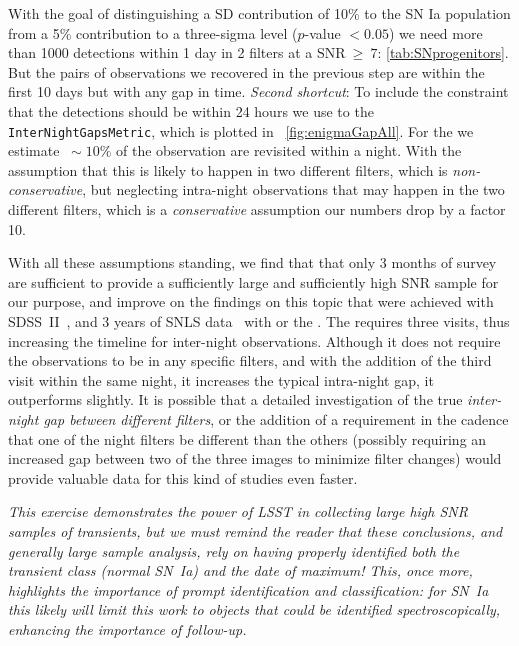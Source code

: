 With the goal of distinguishing a SD contribution of 10\% to the SN Ia
population from a 5\% contribution to a three-sigma level ($p$-value $<0.05$)  we need more
than 1000 detections within 1 day in 2 filters at a
$\mathrm{SNR}~\geq~7$: \autoref{tab:SNprogenitors}. But the pairs
of observations we recovered in the previous step are within the first
10 days but with any gap in time. \emph{Second shortcut}: To include
the constraint that the detections should be within 24 hours we use
to the \texttt{InterNightGapsMetric}, which is plotted in
~\autoref{fig:enigmaGapAll}.  For the  we
estimate $~\sim10\%$ of the observation are revisited within a
night. With the assumption that this is likely to happen in two
different filters, which is \emph{non-conservative}, but neglecting
intra-night observations that may happen in the two different filters,
which is a \emph{conservative} assumption our numbers drop by a factor
10.

With all these assumptions standing, we find that that only 3 months
of survey are sufficient to provide a sufficiently large and
sufficiently high SNR sample for our purpose, and improve on the
findings on this topic that were achieved with
SDSS~II~\citep{Hayden2010}, and 3 years of SNLS data~\citep{Bianco11}
with  or the
. The
 requires three visits, thus
increasing the timeline for inter-night observations. Although it does not
require the observations to be in any specific filters, and with the
addition of the third visit within the same night, it increases the
typical intra-night gap, it outperforms  slightly.
It is possible that a detailed investigation
of the true \emph{inter-night gap between different filters}, or the
addition of a requirement in the cadence that one of the night filters
be different than the others (possibly requiring an increased gap
between two of the three images to minimize filter changes) would
provide valuable data for this kind of studies even faster.

\emph{This exercise demonstrates the power of LSST in collecting large high SNR samples of transients, but we must remind the reader that these conclusions, and generally large sample analysis, rely on having properly identified both the transient class (normal SN~Ia) and the date of maximum! This, once more, highlights the importance of prompt identification and classification: for SN~Ia this likely will limit this work to objects that could be identified spectroscopically, enhancing the importance of follow-up.}


